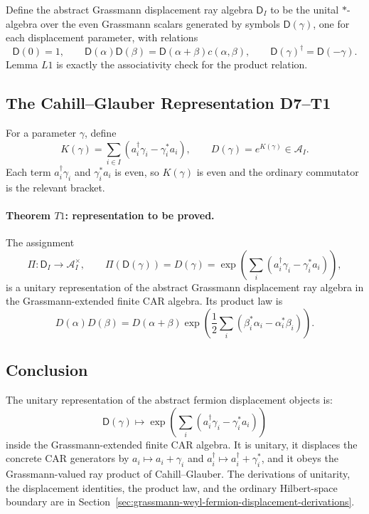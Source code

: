 Define the abstract Grassmann displacement ray algebra \(\mathsf D_I\) to be
the unital \(*\)-algebra over the even Grassmann scalars generated by symbols
\(\mathsf D(\gamma)\), one for each displacement parameter, with relations
\[
  \mathsf D(0)=1,\qquad
  \mathsf D(\alpha)\mathsf D(\beta)
  =
  \mathsf D(\alpha+\beta)c(\alpha,\beta),\qquad
  \mathsf D(\gamma)^\dagger=\mathsf D(-\gamma).
\]
Lemma \(L1\) is exactly the associativity check for the product relation.

\subsection{The Cahill--Glauber Representation D7--T1}

For a parameter \(\gamma\), define
\[
  K(\gamma)=\sum_{i\in I}(a_i^\dagger\gamma_i-\gamma_i^*a_i),
  \qquad
  D(\gamma)=e^{K(\gamma)}\in\mathcal A_I.
\]
Each term \(a_i^\dagger\gamma_i\) and \(\gamma_i^*a_i\) is even, so
\(K(\gamma)\) is even and the ordinary commutator is the relevant bracket.

\paragraph{Theorem \(T1\): representation to be proved.}
The assignment
\[
  \Pi:\mathsf D_I\longrightarrow\mathcal A_I^\times,\qquad
  \Pi(\mathsf D(\gamma))=D(\gamma)
  =
  \exp\!\left(\sum_i(a_i^\dagger\gamma_i-\gamma_i^*a_i)\right),
\]
is a unitary representation of the abstract Grassmann displacement ray algebra
in the Grassmann-extended finite CAR algebra.  Its product law is
\[
  D(\alpha)D(\beta)
  =
  D(\alpha+\beta)
  \exp\!\left(\frac12\sum_i(\beta_i^*\alpha_i-\alpha_i^*\beta_i)\right).
\]

\subsection{Conclusion}

The unitary representation of the abstract fermion displacement objects is:
\[
  \boxed{\mathsf D(\gamma)\mapsto
  \exp\!\left(\sum_i(a_i^\dagger\gamma_i-\gamma_i^*a_i)\right)}
\]
inside the Grassmann-extended finite CAR algebra.  It is unitary, it displaces
the concrete CAR generators by \(a_i\mapsto a_i+\gamma_i\) and
\(a_i^\dagger\mapsto a_i^\dagger+\gamma_i^*\), and it obeys the
Grassmann-valued ray product of Cahill--Glauber.  The derivations of unitarity,
the displacement identities, the product law, and the ordinary Hilbert-space
boundary are in Section~\ref{sec:grassmann-weyl-fermion-displacement-derivations}.
